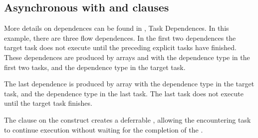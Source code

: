\subsection{Asynchronous  with  and  clauses}
\label{subsec:async_target_nowait_depend}

More details on dependences can be found in , Task 
Dependences. In this example, there are three flow dependences.  In the first two dependences the
target task does not execute until the preceding explicit tasks have finished.   These 
dependences are produced by arrays  and   with the  dependence type in the first two tasks, and the  dependence type in the target task.   

The last dependence is produced by array   with the  dependence type in the target task, and the  dependence type in the last task.  The last task does not execute until the target task finishes.  

The  clause on the  construct creates a deferrable , allowing the encountering task to continue execution without waiting for the completion of the .



